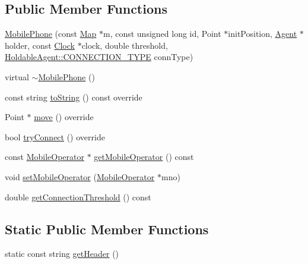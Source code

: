 \subsection*{Public Member Functions}
\begin{DoxyCompactItemize}
\item 
\hyperlink{class_mobile_phone_afd7beed70eb2af3baecd9521332ba8eb}{Mobile\+Phone} (const \hyperlink{class_map}{Map} $\ast$m, const unsigned long id, Point $\ast$init\+Position, \hyperlink{class_agent}{Agent} $\ast$holder, const \hyperlink{class_clock}{Clock} $\ast$clock, double threshold, \hyperlink{class_holdable_agent_ae2c334b004d7b9c5a999cf2618e4e518}{Holdable\+Agent\+::\+C\+O\+N\+N\+E\+C\+T\+I\+O\+N\+\_\+\+T\+Y\+PE} conn\+Type)
\item 
virtual \hyperlink{class_mobile_phone_a51db1d9b4fcc52ea9f8d613dae4f6a4b}{$\sim$\+Mobile\+Phone} ()
\item 
const string \hyperlink{class_mobile_phone_a2b7e556d12a43e380786ad0eccf3ce04}{to\+String} () const override
\item 
Point $\ast$ \hyperlink{class_mobile_phone_a785d0cac08252386603c702ad8f38c5b}{move} () override
\item 
bool \hyperlink{class_mobile_phone_ad91afa811cea8ee124167f5941bcda1b}{try\+Connect} () override
\item 
const \hyperlink{class_mobile_operator}{Mobile\+Operator} $\ast$ \hyperlink{class_mobile_phone_aba72025d08c382d8533e0cbb9166999b}{get\+Mobile\+Operator} () const
\item 
void \hyperlink{class_mobile_phone_ad4db8203e8f2e974733357d7c3e6cf28}{set\+Mobile\+Operator} (\hyperlink{class_mobile_operator}{Mobile\+Operator} $\ast$mno)
\item 
double \hyperlink{class_mobile_phone_a57475711a8f85086f50067d219f1181d}{get\+Connection\+Threshold} () const
\end{DoxyCompactItemize}
\subsection*{Static Public Member Functions}
\begin{DoxyCompactItemize}
\item 
static const string \hyperlink{class_mobile_phone_a38cabfd91b77cd839f497facb9ed937c}{get\+Header} ()
\end{DoxyCompactItemize}
